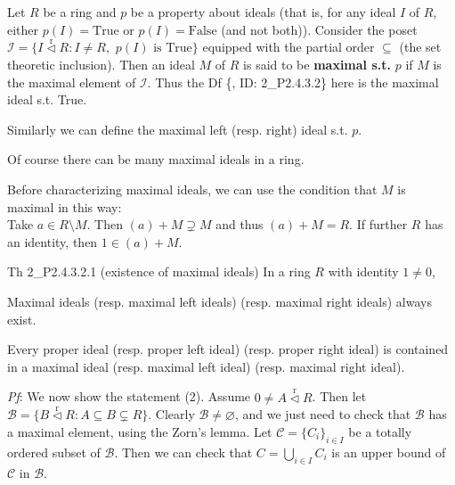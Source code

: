 \documentclass{article}
\newcommand{\nles}{\vartriangleleft}
\newcommand{\ideal}{\overset{\text{r}}{\nles}} %
\begin{document}
\begin{Rmk}{}
    \begin{compactenum}
        \item \textcolor{Df}{Let $R$ be a ring and $p$ be a property about ideals (that is, for any ideal $I$ of $R$, either $p(I) = \text{True}$ or $p(I) = \text{False}$ (and not both)). Consider the poset $\mathcal{I} = \{I\ideal R: I\neq R,\,\, p(I) \text{ is True}\}$ equipped with the partial order $\subseteq$ (the set theoretic inclusion). Then an ideal $M$ of $R$ is said to be \textbf{maximal s.t.} $p$ if $M$ is the maximal element of $\mathcal{I}$.} \textcolor{Th}{Thus the Df \{, ID: 2\_P2.4.3.2\} here is the maximal ideal s.t. True.}
        \item \textcolor{Df}{Similarly we can define the maximal left (resp. right) ideal s.t. $p$.} 
        \item \textcolor{Th}{Of course there can be many maximal ideals in a ring.} 
    \end{compactenum}
    Before characterizing maximal ideals, we can use the condition that $M$ is maximal in this way: \\
    Take $a\in R\setminus M$. Then $(a)+M\supsetneq M$ and thus $(a)+M = R$. If further $R$ has an identity, then $1\in (a)+M$. 
\end{Rmk}

\begin{Th}{Th 2\_P2.4.3.2.1 (existence of maximal ideals)}
    In a ring $R$ with identity $1\neq 0$,
    \begin{compactenum}
        \item[(1)] Maximal ideals (resp. maximal left ideals) (resp. maximal right ideals) always exist.
        \item[(2)] Every proper ideal (resp. proper left ideal) (resp. proper right ideal) is contained in a maximal ideal (resp. maximal left ideal) (resp. maximal right ideal).
    \end{compactenum}
    \tcblower
    \textit{Pf}: We now show the statement (2). Assume $0\neq A\ideal R$. Then let $\mathcal{B} = \{B\ideal R: A\subseteq B\subsetneq R\}$. Clearly $\mathcal{B}\neq\varnothing$, and we just need to check that $\mathcal{B}$ has a maximal element, using the Zorn's lemma. Let $\mathcal{C} = \{C_i\}_{i\in I}$ be a totally ordered subset of $\mathcal{B}$. Then we can check that $C = \bigcup_{i\in I} C_i$ is an upper bound of $\mathcal{C}$ in $\mathcal{B}$. 
\end{Th}
\end{document}
